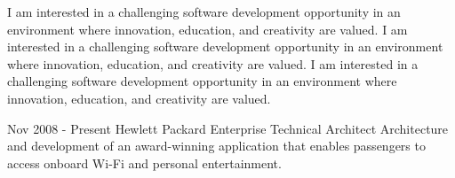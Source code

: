 \documentclass[10pt,letterpaper]{main}
\begin{document}
\begin{paracol}{2}
\begin{rightcolumn}
{I am interested in a challenging software development opportunity in an environment where innovation, education, and creativity are valued. I am interested in a challenging software development opportunity in an environment where innovation, education, and creativity are valued.
I am interested in a challenging software development opportunity in an environment where innovation, education, and creativity are valued.
}

\vfill\null
{}

\cvevent
	{Nov 2008 - Present}
	{Hewlett Packard Enterprise }
	{Technical Architect}
	{Architecture and development of an award-winning application that enables passengers to access onboard Wi-Fi and personal entertainment.}
	{}
	{}
	{}


\end{rightcolumn}
\end{paracol}
\end{document}

